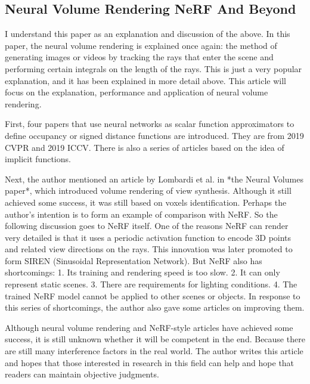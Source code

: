 \documentclass[UTF-8]{ctexart}
\begin{document}
\subsection{Neural Volume Rendering NeRF And Beyond}
I understand this paper as an explanation and discussion of the above. In this paper, the neural volume rendering is explained once again: the method of generating images or videos by tracking the rays that enter the scene and performing certain integrals on the length of the rays. This is just a very popular explanation, and it has been explained in more detail above. This article will focus on the explanation, performance and application of neural volume rendering.

First, four papers that use neural networks as scalar function approximators to define occupancy or signed distance functions are introduced. They are from 2019 CVPR and 2019 ICCV. There is also a series of articles based on the idea of implicit functions.

Next, the author mentioned an article by Lombardi et al. in *the Neural Volumes paper*, which introduced volume rendering of view synthesis. Although it still achieved some success, it was still based on voxels identification. Perhaps the author's intention is to form an example of comparison with NeRF. So the following discussion goes to NeRF itself. One of the reasons NeRF can render very detailed is that it uses a periodic activation function to encode 3D points and related view directions on the rays. This innovation was later promoted to form SIREN (Sinusoidal Representation Network). But NeRF also has shortcomings: 1. Its training and rendering speed is too slow. 2. It can only represent static scenes. 3. There are requirements for lighting conditions. 4. The trained NeRF model cannot be applied to other scenes or objects. In response to this series of shortcomings, the author also gave some articles on improving them.

Although neural volume rendering and NeRF-style articles have achieved some success, it is still unknown whether it will be competent in the end. Because there are still many interference factors in the real world. The author writes this article and hopes that those interested in research in this field can help and hope that readers can maintain objective judgments. 
\end{document}
